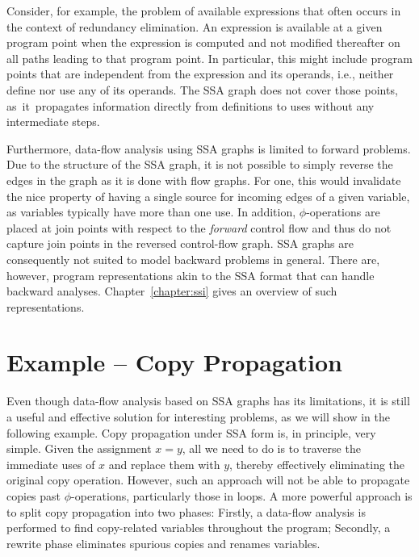 Consider, for example, the problem of available
expressions that often occurs in the context of
redundancy elimination. An expression is available at a given program point when
the expression is computed and not modified thereafter on all paths leading to
that program point. In particular, this might include program points that are
independent from the expression and its operands, i.e., neither define nor use
any of its operands. The SSA graph does not cover those points,
as~it~propagates information directly from definitions to uses without any
intermediate steps.

Furthermore, data-flow analysis using SSA graphs is limited to forward problems.
Due to the structure of the SSA graph, it is not possible to simply reverse the
edges in the graph as it is done with flow graphs. For one, this would
invalidate the nice property of having a single source for incoming edges of a
given variable, as variables typically have more than one use. In addition,
$\phi$-operations are placed at join points with respect to the \emph{forward}
control flow and thus do not capture join points in the reversed control-flow graph.
SSA graphs are consequently not suited to model backward problems in general.
There are, however, program representations akin to the SSA format that can
handle backward analyses.
Chapter~\ref{chapter:ssi} gives an overview of such representations.

\section{Example -- Copy Propagation}
\label{novillo:sec:example}

Even though data-flow analysis based on SSA graphs has its limitations, it is
still a useful and effective solution for interesting problems, as we will
show in the following example.
Copy propagation under SSA form is, in principle, very simple.  Given the
assignment $x = y$, all we need to do is to traverse the immediate
uses of $x$ and replace them with $y$, thereby effectively eliminating the
original copy operation. However, such an approach will not be able to propagate
copies past \linebreak $\phi$-operations, particularly those in loops. A more powerful
approach is to split copy propagation into two phases: Firstly, a data-flow
analysis is performed to find copy-related variables throughout the program;
Secondly, a rewrite phase eliminates spurious copies and renames variables.

